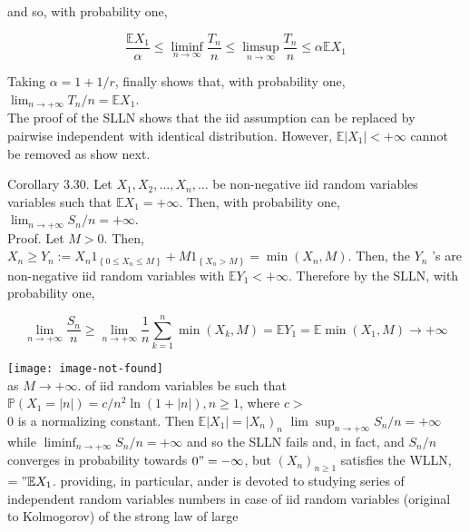 \documentclass[11pt]{amsbook}
\theoremstyle{plain}%
\theoremstyle{definition}
\theoremstyle{remark}
\begin{document}
and so, with probability one,

$$
\frac{\mathbb{E} X_{1}}{\alpha} \leq \liminf _{n \rightarrow \infty} \frac{T_{n}}{n} \leq \limsup _{n \rightarrow \infty} \frac{T_{n}}{n} \leq \alpha \mathbb{E} X_{1}
$$

Taking $\alpha=1+1 / r$, finally shows that, with probability one, $\lim _{n \rightarrow+\infty} T_{n} / n=\mathbb{E} X_{1}$.\\
The proof of the SLLN shows that the iid assumption can be replaced by pairwise independent with identical distribution. However, $\mathbb{E}\left|X_{1}\right|<+\infty$ cannot be removed as show next.

Corollary 3.30. Let $X_{1}, X_{2}, \ldots, X_{n}, \ldots$ be non-negative iid random variables variables such that $\mathbb{E} X_{1}=+\infty$. Then, with probability one, $\lim _{n \rightarrow+\infty} S_{n} / n=+\infty$.\\
Proof. Let $M>0$. Then, $X_{n} \geq Y_{n}:=X_{n} 1_{\left\{0 \leq X_{n} \leq M\right\}}+M 1_{\left\{X_{n}>M\right\}}=\min \left(X_{n}, M\right)$. Then, the $Y_{n}$ 's are non-negative iid random variables with $\mathbb{E} Y_{1}<+\infty$. Therefore by the SLLN, with probability one,

$$
\lim _{n \rightarrow+\infty} \frac{S_{n}}{n} \geq \lim _{n \rightarrow+\infty} \frac{1}{n} \sum_{k=1}^{n} \min \left(X_{k}, M\right)=\mathbb{E} Y_{1}=\mathbb{E} \min \left(X_{1}, M\right) \longrightarrow+\infty
$$

\texttt{[image: image-not-found]}\\
as $M \rightarrow+\infty$. of iid random variables be such that $\mathbb{P}\left(X_{1}=|n|\right)=c / n^{2} \ln (1+|n|), n \geq 1$, where $c>$\\
0 is a normalizing constant. Then $\left.\mathbb{E}\left|X_{1}\right|=\mid X_{n}\right)_{n}$ $\lim \sup _{n \rightarrow+\infty} S_{n} / n=+\infty$ while $\liminf _{n \rightarrow+\infty} S_{n} / n=+\infty$ and so the SLLN fails and, in fact, and $S_{n} / n$ converges in probability towards $0 "=-\infty$, but $\left(X_{n}\right)_{n \geq 1}$ satisfies the WLLN,\\
$=" \mathbb{E} X_{1}$. providing, in particular, ander is devoted to studying series of independent random variables numbers in case of iid random variables (original to Kolmogorov) of the strong law of large
\end{document}
